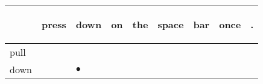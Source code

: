 \documentclass[landscape]{article}
\newcommand{\ssp}{\hspace{2pt}}
\newcommand{\mex}{\cellcolor{g}$\bullet$}
\begin{document}
\noindent\begin{tabular}{|l|p{10pt}|p{10pt}|p{10pt}|p{10pt}|p{10pt}|p{10pt}|p{10pt}|p{10pt}|}
\hline
&\begin{sideways}\cellcolor{ref0}press\hspace{12pt}\end{sideways}&\begin{sideways}\cellcolor{ref1}down\hspace{12pt}\end{sideways}&\begin{sideways}\cellcolor{ref2}on\hspace{12pt}\end{sideways}&\begin{sideways}\cellcolor{ref3}the\hspace{12pt}\end{sideways}&\begin{sideways}\cellcolor{ref4}space\hspace{12pt}\end{sideways}&\begin{sideways}\cellcolor{ref5}bar\hspace{12pt}\end{sideways}&\begin{sideways}\cellcolor{ref6}once\hspace{12pt}\end{sideways}&\begin{sideways}\cellcolor{ref7}.\hspace{12pt}\end{sideways}\\
\hline
\ssp pull \ssp&\hspace{2pt}&\hspace{2pt}&\hspace{2pt}&\hspace{2pt}&\hspace{2pt}&\hspace{2pt}&\hspace{2pt}&\hspace{2pt}\\
\hline
\ssp \cellcolor{ref1}down \ssp&\hspace{2pt}&\hspace{2pt}\mex&\hspace{2pt}&\hspace{2pt}&\hspace{2pt}&\hspace{2pt}&\hspace{2pt}&\hspace{2pt}\\

\end{tabular}
\end{document}
